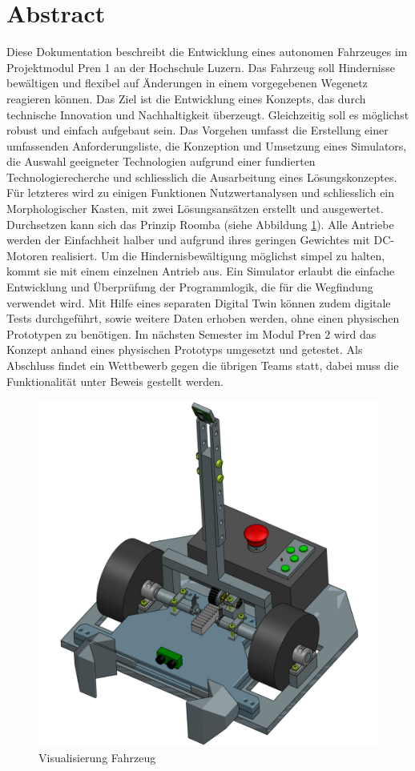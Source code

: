 \newpage
\section{Abstract}

Diese Dokumentation beschreibt die Entwicklung eines autonomen Fahrzeuges im Projektmodul Pren 1 an der Hochschule Luzern. Das Fahrzeug soll Hindernisse bewältigen und flexibel auf Änderungen in einem vorgegebenen Wegenetz reagieren können. Das Ziel ist die Entwicklung eines Konzepts, das durch technische Innovation und Nachhaltigkeit überzeugt. Gleichzeitig soll es möglichst robust und einfach aufgebaut sein.
Das Vorgehen umfasst die Erstellung einer umfassenden Anforderungsliste, die Konzeption und Umsetzung eines Simulators, die Auswahl geeigneter Technologien aufgrund einer fundierten Technologierecherche und schliesslich die Ausarbeitung eines Lösungskonzeptes. Für letzteres wird zu einigen Funktionen Nutzwertanalysen und schliesslich ein Morphologischer Kasten, mit zwei Lösungsansätzen erstellt und ausgewertet. Durchsetzen kann sich das Prinzip Roomba (siehe Abbildung \ref{img:Visualisierung Fahrzeug}). Alle Antriebe werden der Einfachheit halber und aufgrund ihres geringen Gewichtes mit DC-Motoren realisiert. Um die Hindernisbewältigung möglichst simpel zu halten, kommt sie mit einem einzelnen Antrieb aus. Ein Simulator erlaubt die einfache Entwicklung und Überprüfung der Programmlogik, die für die Wegfindung verwendet wird. Mit Hilfe eines separaten Digital Twin können zudem digitale Tests durchgeführt, sowie weitere Daten erhoben werden, ohne einen physischen Prototypen zu benötigen. 
Im nächsten Semester im Modul Pren 2 wird das Konzept anhand eines physischen Prototyps umgesetzt und getestet. Als Abschluss findet ein Wettbewerb gegen die übrigen Teams statt, dabei muss die Funktionalität unter Beweis gestellt werden.

\begin{figure}[H] %
    \centering
        \includegraphics[width=0.5\linewidth]       {Skizze_Fahrzeug.png}               \caption[Visualisierung Fahrzeug]
        {Visualisierung Fahrzeug}
        
        \label{img:Visualisierung Fahrzeug}
    \end{figure} 